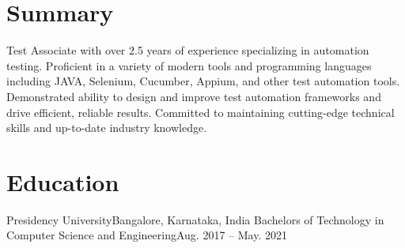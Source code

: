 \documentclass{resume}
\begin{document}


\section{Summary}
\begin{summary}
  Test Associate with over 2.5 years of experience specializing in automation testing. Proficient in a variety of modern tools and programming languages including JAVA, Selenium, Cucumber, Appium, and other test automation tools. Demonstrated ability to design and improve test automation frameworks and drive efficient, reliable results. Committed to maintaining cutting-edge technical skills and up-to-date industry knowledge.
\end{summary}

\section{Education}
\resumeSubHeadingListStart
  \datedsubsection
    {Presidency University}{Bangalore, Karnataka, India}
    {Bachelors of Technology in Computer Science and Engineering}{Aug. 2017 -- May. 2021}
\resumeSubHeadingListEnd
\end{document}
